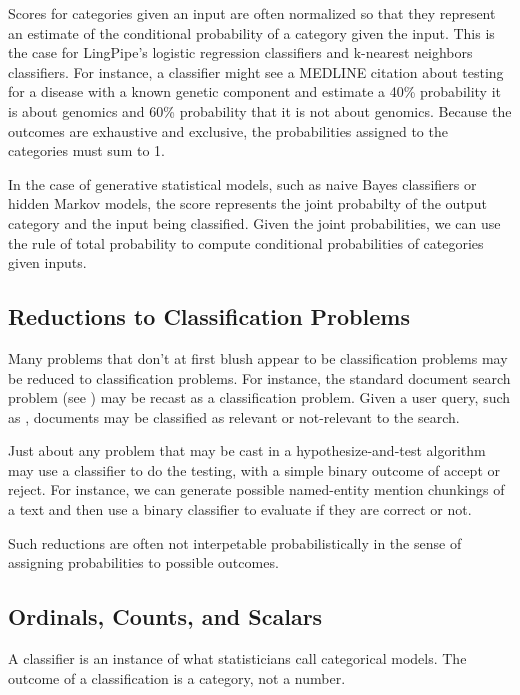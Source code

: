 Scores for categories given an input are often normalized so that they
represent an estimate of the conditional probability of a category
given the input.  This is the case for LingPipe's logistic regression
classifiers and k-nearest neighbors classifiers.  For instance, a
classifier might see a MEDLINE citation about testing for a disease
with a known genetic component and estimate a 40\% probability it is
about genomics and 60\% probability that it is not about genomics.
Because the outcomes are exhaustive and exclusive, the probabilities
assigned to the categories must sum to 1.

In the case of generative statistical models, such as naive Bayes
classifiers or hidden Markov models, the score represents the joint
probabilty of the output category and the input being classified.
Given the joint probabilities, we can use the rule of total
probability to compute conditional probabilities of categories given
inputs.

\subsection{Reductions to Classification Problems}

Many problems that don't at first blush appear to be classification
problems may be reduced to classification problems.  For instance, the
standard document search problem (see ) may be recast
as a classification problem.  Given a user query, such as
, documents may be classified as
relevant or not-relevant to the search.  

Just about any problem that may be cast in a hypothesize-and-test
algorithm may use a classifier to do the testing, with a simple binary
outcome of accept or reject.  For instance, we can generate possible
named-entity mention chunkings of a text and then use a binary
classifier to evaluate if they are correct or not.  

Such reductions are often not interpetable probabilistically in the
sense of assigning probabilities to possible outcomes.

\subsection{Ordinals, Counts, and Scalars}

A classifier is an instance of what statisticians call categorical
models.  The outcome of a classification is a category, not a number.

